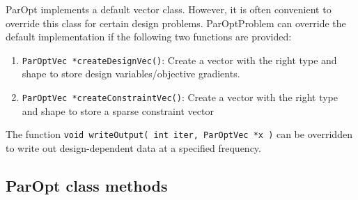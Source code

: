 \documentclass[12pt]{article}
\begin{document}
ParOpt implements a default vector class. However, it is often convenient to override this class for certain design problems.
ParOptProblem can override the default implementation if the following two functions are provided:
\begin{enumerate}
\item \texttt{ParOptVec *createDesignVec()}: Create a vector with the right type and shape to store design variables/objective gradients.
\item \texttt{ParOptVec *createConstraintVec()}: Create a vector with the right type and shape to store a sparse constraint vector
\end{enumerate}  

The function \texttt{void writeOutput( int iter, ParOptVec *x )} can be overridden to write out design-dependent data at a specified frequency.
  
\subsection{ParOpt class methods}
\end{document}
